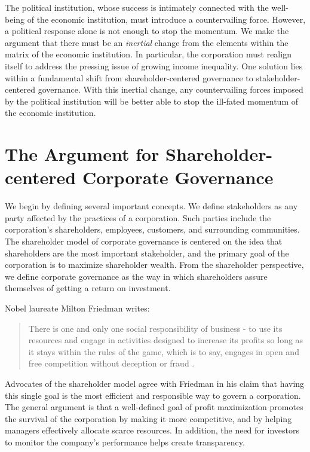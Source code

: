 \documentclass[12pt]{article}
\begin{document}
The political institution, whose success is intimately connected with the well-being of the economic institution, must introduce a countervailing force. However, a political response alone is not enough to stop the momentum. We make the argument that there must be an \linebreak \textit{inertial} change from the elements within the matrix of the economic institution. In particular, the corporation must realign itself to address the pressing issue of growing income inequality. One solution lies within a fundamental shift from shareholder-centered governance to stakeholder-centered governance. With this inertial change, any countervailing forces imposed by the political institution will be better able to stop the ill-fated momentum of the economic institution. 

\section{\large The Argument for Shareholder-centered Corporate Governance}
We begin by defining several important concepts. We define stakeholders as any party affected by the practices of a corporation. Such parties include the corporation's shareholders, employees, customers, and surrounding communities. The shareholder model of corporate governance is centered on the idea that shareholders are the most important stakeholder, and the primary goal of the corporation is to maximize shareholder wealth. From the shareholder perspective, we define corporate governance as the way in which shareholders assure themselves of getting a return on investment.

\noindent Nobel laureate Milton Friedman writes:
\blockquote{There is one and only one social responsibility of business - to use its resources and engage in activities designed to increase its profits so long as it stays within the rules of the game, which is to say, engages in open and free competition without deception or fraud \cite[Friedman 6]{Friedman}.}
Advocates of the shareholder model agree with Friedman in his claim that having this single goal is the most efficient and responsible way to govern a corporation. The general argument is that a well-defined goal of profit maximization promotes the survival of the corporation by making it more competitive, and by helping managers effectively allocate scarce resources. In addition, the need for investors to monitor the company's performance helps create transparency. 
\end{document}
